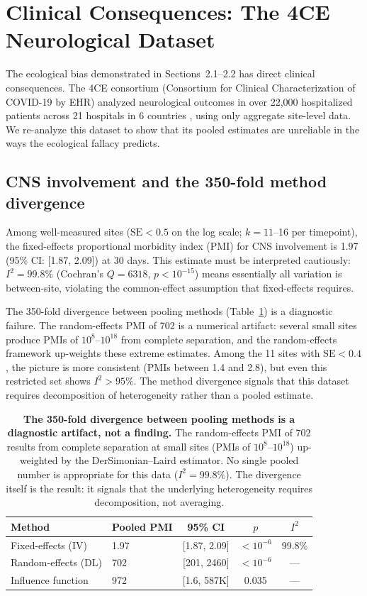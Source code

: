 \documentclass{article}
\begin{document}
\section{Clinical Consequences: The 4CE Neurological Dataset}

The ecological bias demonstrated in Sections~2.1--2.2 has direct clinical
consequences.  The 4CE consortium (Consortium for Clinical Characterization
of COVID-19 by EHR) analyzed neurological outcomes in over 22,000
hospitalized patients across 21 hospitals in 6 countries
\cite{four_ce_neuro2021}, using only aggregate site-level data.  We
re-analyze this dataset to show that its pooled estimates are unreliable
in the ways the ecological fallacy predicts.


\subsection{CNS involvement and the 350-fold method divergence}

Among well-measured sites ($\text{SE} < 0.5$ on the log scale; $k = 11$--16
per timepoint), the fixed-effects proportional morbidity index (PMI) for CNS
involvement is 1.97 (95\% CI: [1.87, 2.09]) at 30 days.  This estimate must
be interpreted cautiously: $I^2 = 99.8\%$ (Cochran's $Q = 6318$, $p <
10^{-15}$) means essentially all variation is between-site, violating the
common-effect assumption that fixed-effects requires.

The 350-fold divergence between pooling methods (Table~\ref{tab:meta}) is a
diagnostic failure.  The random-effects PMI of 702 is a numerical artifact:
several small sites produce PMIs of $10^{8}$--$10^{18}$ from complete
separation, and the random-effects framework up-weights these extreme
estimates.  Among the 11 sites with $\text{SE} < 0.4$, the picture is more
consistent (PMIs between 1.4 and 2.8), but even this restricted set shows
$I^2 > 95\%$.  The method divergence signals that this dataset requires
decomposition of heterogeneity rather than a pooled estimate.

\begin{table}[t]
\centering
\caption{\textbf{The 350-fold divergence between pooling methods is a
diagnostic artifact, not a finding.}  The random-effects PMI of 702 results
from complete separation at small sites (PMIs of $10^{8}$--$10^{18}$)
up-weighted by the DerSimonian--Laird estimator.  No single pooled number
is appropriate for this data ($I^2 = 99.8\%$).  The divergence itself is
the result: it signals that the underlying heterogeneity requires
decomposition, not averaging.}
\label{tab:meta}
\begin{tabular}{llccc}
\toprule
Method & Pooled PMI & 95\% CI & $p$ & $I^2$ \\
\midrule
Fixed-effects (IV) & 1.97 & [1.87, 2.09] & $< 10^{-6}$ & 99.8\% \\
Random-effects (DL) & 702 & [201, 2460] & $< 10^{-6}$ & --- \\
Influence function & 972 & [1.6, 587K] & 0.035 & --- \\
\bottomrule
\end{tabular}
\end{table}
\end{document}
